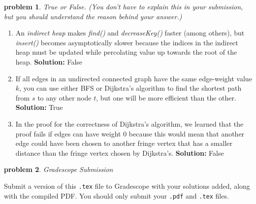 \documentclass[10pt]{article}
\newcommand{\solution}[1]{\color{blue}\hfill\break\noindent\textbf{Solution:} #1\color{black}}
\newtheorem{problem}{\sc\color{cit}problem}
\begin{document}
\begin{problem} True or False. (You don't have to explain this in your submission, but you should understand the reason behind your answer.)  \end{problem}

\begin{enumerate}
\renewcommand{\theenumi}{\Alph{enumi}}

\item An \emph{indirect heap} makes \emph{find()} and \emph{decreaseKey()} faster (among others), but \emph{insert()\/} becomes asymptotically slower because the indices in the indirect heap must be updated while percolating value up towards the root of the heap.
\solution{
    False
}

\item If all edges in an undirected connected graph have the same edge-weight value $k$, you can use either BFS or Dijkstra's algorithm to find the shortest path from $s$ to any other node $t$, but one will be more efficient than the other.
\solution{
    True
}

\item In the proof for the correctness of Dijkstra's algorithm, we learned that the proof fails if edges can have weight $0$ because this would mean that another edge could have been chosen to another fringe vertex that has a smaller distance than the fringe vertex chosen by Dijkstra's.
\solution{
    False
}

\end{enumerate}

  

\begin{problem} Gradescope Submission \end{problem}
Submit a version of this \verb|.tex| file to Gradescope with your solutions added, along with the compiled PDF.  You should only submit your \verb|.pdf| and \verb|.tex| files.
\end{document}
